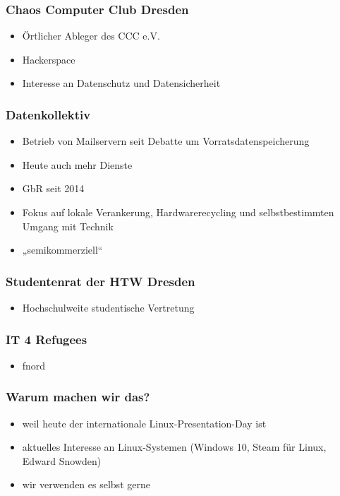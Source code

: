 \documentclass[t]{beamer}
\begin{document}
\begin{frame}
  \frametitle{Chaos Computer Club Dresden}
  \begin{itemize}
  \item Örtlicher Ableger des CCC e.V.
  \item Hackerspace
  \item Interesse an Datenschutz und Datensicherheit
  \end{itemize}
\end{frame}

\begin{frame}
  \frametitle{Datenkollektiv}
  \begin{itemize}
  \item Betrieb von Mailservern seit Debatte um Vorratsdatenspeicherung
  \item Heute auch mehr Dienste
  \item GbR seit 2014
  \item Fokus auf lokale Verankerung, Hardwarerecycling und selbstbestimmten Umgang mit Technik
  \item „semikommerziell“
  \end{itemize}
\end{frame}

\begin{frame}
  \frametitle{Studentenrat der HTW Dresden}
  \begin{itemize}
  \item Hochschulweite studentische Vertretung
  \end{itemize}
\end{frame}

\begin{frame}
  \frametitle{IT 4 Refugees}
  \begin{itemize}
  \item fnord
  \end{itemize}
\end{frame}

\begin{frame}
  \frametitle{Warum machen wir das?}
  \begin{itemize}
  \item weil heute der internationale Linux-Presentation-Day ist
  \item aktuelles Interesse an Linux-Systemen (Windows 10, Steam
    für Linux, Edward Snowden)
  \item wir verwenden es selbst gerne
  \end{itemize}
\end{frame}
\end{document}
